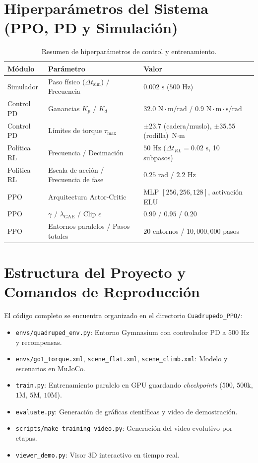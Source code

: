 \documentclass[12pt,a4paper]{article}
\begin{document}
\section{Hiperparámetros del Sistema (PPO, PD y Simulación)}
\begin{table}[H]
\centering
\caption{Resumen de hiperparámetros de control y entrenamiento.}
\begin{tabular}{@{}lll@{}}
\toprule
\textbf{Módulo} & \textbf{Parámetro} & \textbf{Valor} \\ \midrule
Simulador & Paso físico ($\Delta t_{\text{sim}}$) / Frecuencia & $0.002\text{ s}$ ($500\text{ Hz}$) \\
Control PD & Ganancias $K_p$ / $K_d$ & $32.0\text{ N}\cdot\text{m/rad}$ / $0.9\text{ N}\cdot\text{m}\cdot\text{s/rad}$ \\
Control PD & Límites de torque $\tau_{\max}$ & $\pm 23.7$ (cadera/muslo), $\pm 35.55$ (rodilla) $\text{N}\cdot\text{m}$ \\
Política RL & Frecuencia / Decimación & $50\text{ Hz}$ ($\Delta t_{RL}=0.02\text{ s}$, 10 subpasos) \\
Política RL & Escala de acción / Frecuencia de fase & $0.25\text{ rad}$ / $2.2\text{ Hz}$ \\
PPO & Arquitectura Actor-Critic & MLP $[256, 256, 128]$, activación ELU \\
PPO & $\gamma$ / $\lambda_{\text{GAE}}$ / Clip $\epsilon$ & $0.99$ / $0.95$ / $0.20$ \\
PPO & Entornos paralelos / Pasos totales & $20$ entornos / $10{,}000{,}000$ pasos \\ \bottomrule
\end{tabular}
\end{table}

\section{Estructura del Proyecto y Comandos de Reproducción}
El código completo se encuentra organizado en el directorio \texttt{Cuadrupedo\_PPO/}:
\begin{itemize}
    \item \texttt{envs/quadruped\_env.py}: Entorno Gymnasium con controlador PD a $500\text{ Hz}$ y recompensas.
    \item \texttt{envs/go1\_torque.xml}, \texttt{scene\_flat.xml}, \texttt{scene\_climb.xml}: Modelo y escenarios en MuJoCo.
    \item \texttt{train.py}: Entrenamiento paralelo en GPU guardando \textit{checkpoints} ($500$, $500\text{k}$, $1\text{M}$, $5\text{M}$, $10\text{M}$).
    \item \texttt{evaluate.py}: Generación de gráficas científicas y video de demostración.
    \item \texttt{scripts/make\_training\_video.py}: Generación del video evolutivo por etapas.
    \item \texttt{viewer\_demo.py}: Visor 3D interactivo en tiempo real.
\end{itemize}
\end{document}
